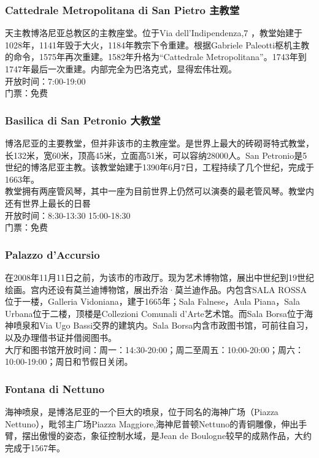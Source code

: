 \subsubsection{Cattedrale Metropolitana di San Pietro 主教堂}
天主教博洛尼亚总教区的主教座堂。位于Via dell'Indipendenza,7 ，教堂始建于1028年，1141年毁于大火，1184年教宗下令重建。根据Gabriele Paleotti枢机主教的命令，1575年再次重建。1582年升格为“Cattedrale Metropolitana”。1743年到1747年最后一次重建。内部完全为巴洛克式，显得宏伟壮观。\\
开放时间：7:00-19:00\\
门票：免费

\subsubsection{Basilica di San Petronio 大教堂}
博洛尼亚的主要教堂，但并非该市的主教座堂。是世界上最大的砖砌哥特式教堂，长132米，宽60米，顶高45米，立面高51米，可以容纳28000人。San Petronio是5世纪的博洛尼亚主教。该教堂始建于1390年6月7日，工程持续了几个世纪，完成于1663年。\\
教堂拥有两座管风琴，其中一座为目前世界上仍然可以演奏的最老管风琴。教堂内还有世界上最长的日晷\\
开放时间：8:30-13:30 15:00-18:30\\
门票：免费

\subsubsection{Palazzo d'Accursio}
在2008年11月11日之前，为该市的市政厅。现为艺术博物馆，展出中世纪到19世纪绘画。宫内还设有莫兰迪博物馆，展出乔治·莫兰迪作品。内包含SALA ROSSA位于一楼，Galleria Vidoniana，建于1665年；Sala Falnese，Aula Piana，Sala Urbana位于二楼，顶楼是Collezioni Comunali d'Arte艺术馆。而Sala Borsa位于海神喷泉和Via Ugo Bassi交界的建筑内。Sala Borsa内含市政图书馆，可前往自习，以及办理借书证并借阅图书。\\
大厅和图书馆开放时间：周一：14:30-20:00；周二至周五：10:00-20:00；周六：10:00-19:00；周日和节假日关闭。\\

\subsubsection{Fontana di Nettuno}
海神喷泉，是博洛尼亚的一个巨大的喷泉，位于同名的海神广场（Piazza Nettuno），毗邻主广场Piazza Maggiore,海神尼普顿Nettuno的青铜雕像，伸出手臂，摆出傲慢的姿态，象征控制水域，是Jean de Boulogne较早的成熟作品，大约完成于1567年。


